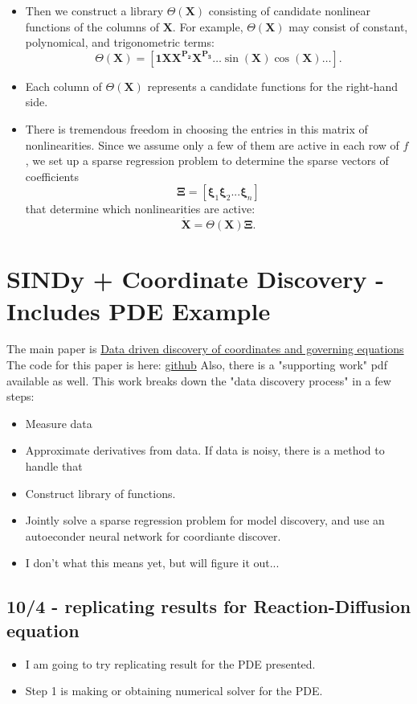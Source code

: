 \documentclass[12pt]{article}
\newcounter{problem}
\begin{document}
\begin{itemize}
\[        \]
    \item Then we construct a library $\Theta(\bm{X})$ consisting of candidate nonlinear functions of the columns of $\bm{X}$. For example, $\Theta(\bm{X})$ may consist of constant, polynomical, and trigonometric terms:
        \[
            \Theta(\bm{X}) = \left[ \bm{1} \bm{X} \bm{X^{P_2}} \bm{X^{P_3}} \dots \sin(\bm{X}) \cos(\bm{X}) \dots \right].
        \]
    \item Each column of $\Theta(\bm{X})$ represents a candidate functions for the right-hand side.
    \item There is tremendous freedom in choosing the entries in this matrix of nonlinearities. Since we assume only a few of them are active in each row of $f$, we set up a sparse regression problem to determine the sparse vectors of coefficients
        \[
            \bm{\Xi} = \left[ \bm{\xi}_1 \bm{\xi}_2 ... \bm{\xi}_n\right]
        \] 
        that determine which nonlinearities are active:
        \[
            \dot{\bm{X}} = \Theta(\bm{X})\bm{\Xi}.
        \] 
       \end{itemize}
\section{SINDy + Coordinate Discovery - Includes PDE Example}
The main paper is \href{https://www.pnas.org/doi/pdf/10.1073/pnas.1906995116}{Data driven discovery of coordinates and governing equations}\newline
The code for this paper is here: \href{https://github.com/kpchamp/SindyAutoencoders}{github}
Also, there is a "supporting work" pdf available as well.\newline
This work breaks down the "data discovery process" in a few steps:
\begin{itemize}
    \item Measure data
    \item Approximate derivatives from data. If data is noisy, there is a method to handle that
    \item Construct library of functions.
    \item Jointly solve a sparse regression problem for model discovery, and use an autoeconder neural network for coordiante discover.
    \item I don't what this means yet, but will figure it out...
\end{itemize}

\subsection{10/4 - replicating results for Reaction-Diffusion equation}
\begin{itemize}
    \item I am going to try replicating result for the PDE presented.
    \item Step 1 is making or obtaining numerical solver for the PDE.
\end{itemize}
\end{document}
